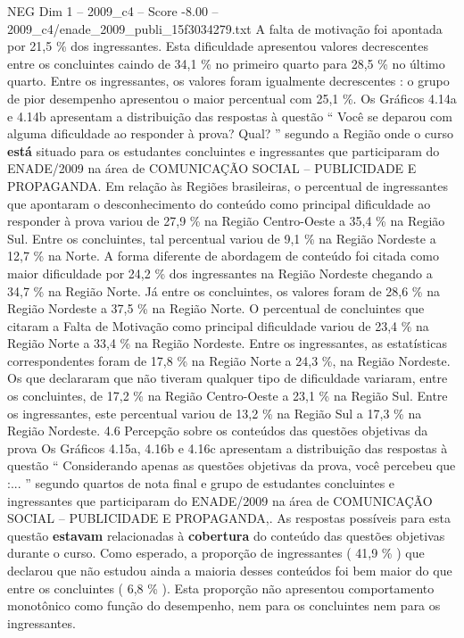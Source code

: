 \begin{textsample}{NEG Dim 1 – 2009\_c4 – Score -8.00 – 2009\_c4/enade\_2009\_publi\_15f3034279.txt}
A falta de motivação foi apontada por 21,5 \% dos ingressantes.
Esta dificuldade apresentou valores decrescentes entre os concluintes caindo de 34,1 \% no primeiro quarto para 28,5 \% no último quarto.
Entre os ingressantes, os valores foram igualmente decrescentes : o grupo de pior desempenho apresentou o maior percentual com 25,1 \%.
Os Gráficos 4.14a e 4.14b apresentam a distribuição das respostas à questão “ Você se deparou com alguma dificuldade ao responder à prova?
Qual? ” segundo a Região onde o curso \textbf{está} situado para os estudantes concluintes e ingressantes que participaram do ENADE/2009 na área de COMUNICAÇÃO SOCIAL – PUBLICIDADE E PROPAGANDA.
Em relação às Regiões brasileiras, o percentual de ingressantes que apontaram o desconhecimento do conteúdo como principal dificuldade ao responder à prova variou de 27,9 \% na Região Centro-Oeste a 35,4 \% na Região Sul.
Entre os concluintes, tal percentual variou de 9,1 \% na Região Nordeste a 12,7 \% na Norte.
A forma diferente de abordagem de conteúdo foi citada como maior dificuldade por 24,2 \% dos ingressantes na Região Nordeste chegando a 34,7 \% na Região Norte.
Já entre os concluintes, os valores foram de 28,6 \% na Região Nordeste a 37,5 \% na Região Norte.
O percentual de concluintes que citaram a Falta de Motivação como principal dificuldade variou de 23,4 \% na Região Norte a 33,4 \% na Região Nordeste.
Entre os ingressantes, as estatísticas correspondentes foram de 17,8 \% na Região Norte a 24,3 \%, na Região Nordeste.
Os que declararam que não tiveram qualquer tipo de dificuldade variaram, entre os concluintes, de 17,2 \% na Região Centro-Oeste a 23,1 \% na Região Sul.
Entre os ingressantes, este percentual variou de 13,2 \% na Região Sul a 17,3 \% na Região Nordeste. 4.6 Percepção sobre os conteúdos das questões objetivas da prova Os Gráficos 4.15a, 4.16b e 4.16c apresentam a distribuição das respostas à questão “ Considerando apenas as questões objetivas da prova, você percebeu que :... ” segundo quartos de nota final e grupo de estudantes concluintes e ingressantes que participaram do ENADE/2009 na área de COMUNICAÇÃO SOCIAL – PUBLICIDADE E PROPAGANDA,.
As respostas possíveis para esta questão \textbf{estavam} relacionadas à \textbf{cobertura} do conteúdo das questões objetivas durante o curso.
Como esperado, a proporção de ingressantes ( 41,9 \% ) que declarou que não estudou ainda a maioria desses conteúdos foi bem maior do que entre os concluintes ( 6,8 \% ).
Esta proporção não apresentou comportamento monotônico como função do desempenho, nem para os concluintes nem para os ingressantes.

\end{textsample}
